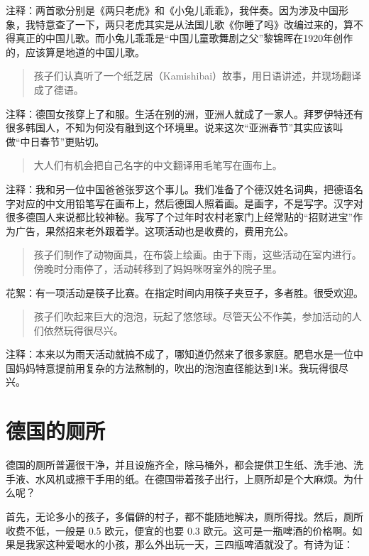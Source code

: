 \documentclass[twoside,openright,headings=optiontohead]{ctexbook} %
\begin{document}
{注释：两首歌分别是《两只老虎》和《小兔儿乖乖》，我伴奏。因为涉及中国形象，我特意查了一下，两只老虎其实是从法国儿歌《你睡了吗》改编过来的，算不得真正的中国儿歌。而小兔儿乖乖是``中国儿童歌舞剧之父''黎锦晖在1920年创作的，应该算是地道的中国儿歌。

\begin{quote}
孩子们认真听了一个纸芝居（Kamishibai）故事，用日语讲述，并现场翻译成了德语。
\end{quote}

注释：德国女孩穿上了和服。生活在别的洲，亚洲人就成了一家人。拜罗伊特还有很多韩国人，不知为何没有融到这个环境里。说来这次``亚洲春节''其实应该叫做``中日春节''更贴切。

\begin{quote}
大人们有机会把自己名字的中文翻译用毛笔写在画布上。
\end{quote}

注释：我和另一位中国爸爸张罗这个事儿。我们准备了个德汉姓名词典，把德语名字对应的中文用铅笔写在画布上，然后德国人照着画。是画字，不是写字。汉字对很多德国人来说都比较神秘。我写了个过年时农村老家门上经常贴的``招财进宝''作为广告，果然招来老外跟着学。这项活动也是收费的，费用充公。

\begin{quote}
孩子们制作了动物面具，在布袋上绘画。由于下雨，这些活动在室内进行。傍晚时分雨停了，活动转移到了妈妈咪呀室外的院子里。
\end{quote}

花絮：有一项活动是筷子比赛。在指定时间内用筷子夹豆子，多者胜。很受欢迎。

\begin{quote}
孩子们吹起来巨大的泡泡，玩起了悠悠球。尽管天公不作美，参加活动的人们依然玩得很尽兴。
\end{quote}

注释：本来以为雨天活动就搞不成了，哪知道仍然来了很多家庭。肥皂水是一位中国妈妈特意提前用复杂的方法熬制的，吹出的泡泡直径能达到1米。我玩得很尽兴。

\chapter*{德国的厕所}\label{wc-de}

德国的厕所普遍很干净，并且设施齐全，除马桶外，都会提供卫生纸、洗手池、洗手液、水风机或擦干手用的纸。在德国带着孩子出行，上厕所却是个大麻烦。为什么呢？

首先，无论多小的孩子，多偏僻的村子，都不能随地解决，厕所得找。然后，厕所收费不低，一般是
0.5 欧元，便宜的也要 0.3
欧元。这可是一瓶啤酒的价格啊。如果是我家这种爱喝水的小孩，那么外出玩一天，三四瓶啤酒就没了。有诗为证：

}
\end{document}
